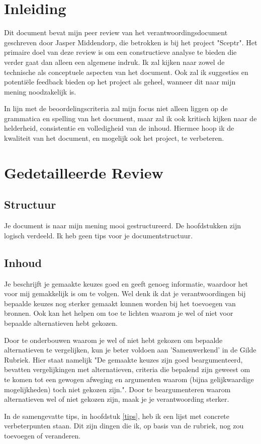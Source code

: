 \documentclass[a4paper]{report}
\begin{document}
\chapter{Inleiding}
Dit document bevat mijn peer review van het verantwoordingsdocument geschreven door Jasper Middendorp, die betrokken is bij het project "Sceptr". 
Het primaire doel van deze review is om een constructieve analyse te bieden die verder gaat dan alleen een algemene indruk. 
Ik zal kijken naar zowel de technische als conceptuele aspecten van het document. Ook zal ik suggesties en potentiële feedback bieden op het project als geheel, wanneer dit naar mijn mening noodzakelijk is.
\par \smallskip
In lijn met de beoordelingscriteria zal mijn focus niet alleen liggen op de grammatica en spelling van het document, maar zal ik ook kritisch kijken naar de helderheid, consistentie en volledigheid van de inhoud.
Hiermee hoop ik de kwaliteit van het document, en mogelijk ook het project, te verbeteren.


\chapter{Gedetailleerde Review}
\section{Structuur}
Je document is naar mijn mening mooi gestructureerd. De hoofdstukken zijn logisch verdeeld.
Ik heb geen tips voor je documentstructuur.

\section{Inhoud}
Je beschrijft je gemaakte keuzes goed en geeft genoeg informatie, waardoor het voor mij gemakkelijk is om te volgen.
Wel denk ik dat je verantwoordingen bij bepaalde keuzes nog sterker gemaakt kunnen worden bij het toevoegen van bronnen. 
Ook kan het helpen om toe te lichten waarom je wel of niet voor bepaalde alternatieven hebt gekozen.
\par\smallskip
Door te onderbouwen waarom je wel of niet hebt gekozen om bepaalde alternatieven te vergelijken, kun je beter voldoen aan 'Samenwerkend' in de Gilde Rubriek\cite{rubriek}.
Hier staat namelijk "De gemaakte keuzes zijn goed beargumenteerd, bevatten vergelijkingen met alternatieven, criteria die bepalend zijn geweest om te komen tot een gewogen afweging en argumenten waarom (bijna gelijkwaardige mogelijkheden) toch niet gekozen zijn.".
Door te beargumenteren waarom alternatieven wel of niet gekozen zijn, maak je je verantwoording sterker.
\par\smallskip
In de samengevatte tips, in hoofdstuk \ref{tips}, heb ik een lijst met concrete verbeterpunten staan.
Dit zijn dingen die ik, op basis van de rubriek, nog zou toevoegen of veranderen.
\end{document}
